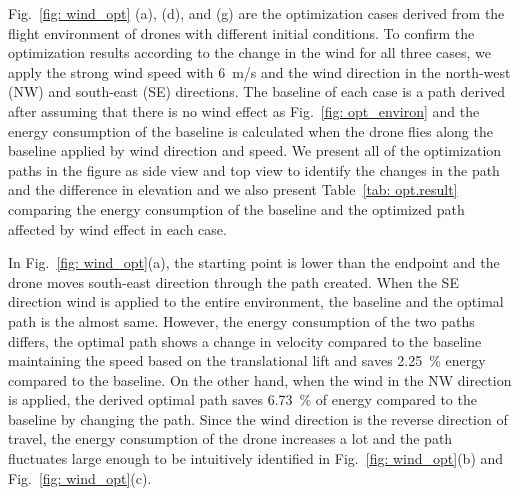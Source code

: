 \documentclass[journal]{./template/IEEEtran}
\begin{document}
Fig.~\ref{fig: wind_opt} (a), (d), and (g) are the optimization cases derived from the flight environment of drones with different initial conditions.
To confirm the optimization results according to the change in the wind for all three cases, we apply the strong wind speed with 6~m/s and the wind direction in the north-west (NW) and south-east (SE) directions.
The baseline of each case is a path derived after assuming that there is no wind effect as Fig.~\ref{fig: opt_environ} and the energy consumption of the baseline is calculated when the drone flies along the baseline applied by wind direction and speed.
We present all of the optimization paths in the figure as side view and top view to identify the changes in the path and the difference in elevation and we also present Table~\ref{tab: opt.result} comparing the energy consumption of the baseline and the optimized path affected by wind effect in each case.


\begin{table}[ht]
\caption{Comparison of the energy consumption between the baseline and the optimal path affected by wind effect in each case.}
\label{tab: opt.result}
\end{table}

In Fig.~\ref{fig: wind_opt}(a), the starting point is lower than the endpoint and the drone moves south-east direction through the path created. 
When the SE direction wind is applied to the entire environment, the baseline and the optimal path is the almost same.
However, the energy consumption of the two paths differs, the optimal path shows a change in velocity compared to the baseline maintaining the speed based on the translational lift and saves 2.25~\% energy compared to the baseline.
On the other hand, when the wind in the NW direction is applied, the derived optimal path saves 6.73~\% of energy compared to the baseline by changing the path.
Since the wind direction is the reverse direction of travel, the energy consumption of the drone increases a lot and the path fluctuates large enough to be intuitively identified in Fig.~\ref{fig: wind_opt}(b) and Fig.~\ref{fig: wind_opt}(c).  
\end{document}
